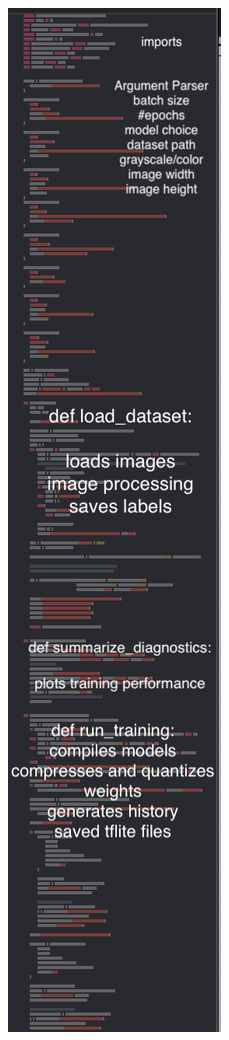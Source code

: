 \begin{figure}
    \centering
    \includegraphics[height = 20 cm]{images/code_body_xcode.png}
    \quad

\end{figure}
